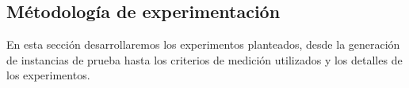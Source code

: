 \subsection{Métodología de experimentación}
En esta sección desarrollaremos los experimentos planteados, desde la generación de instancias de prueba hasta los criterios de medición utilizados y los detalles de los experimentos.
%
%
%

